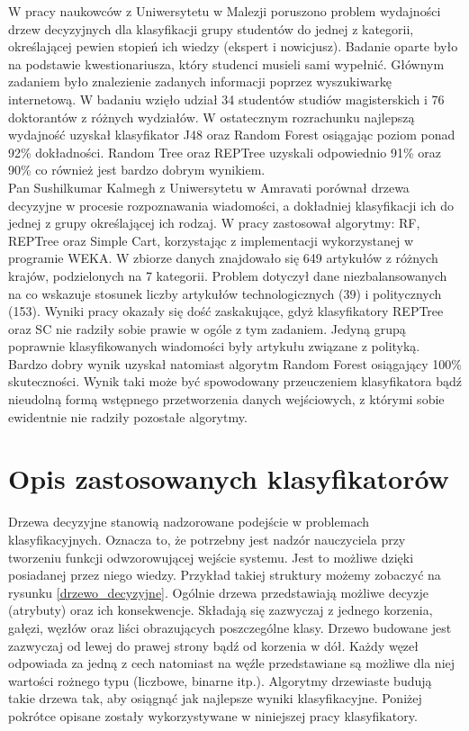 \documentclass[conference]{IEEEtran}
\begin{document}
\indent W pracy naukowców z Uniwersytetu w Malezji poruszono problem wydajności drzew decyzyjnych dla klasyfikacji grupy studentów do jednej z kategorii, określającej pewien stopień ich wiedzy (ekspert i nowicjusz). Badanie oparte było na podstawie kwestionariusza, który studenci musieli sami wypełnić. Głównym zadaniem było znalezienie zadanych informacji poprzez wyszukiwarkę internetową. W badaniu wzięło udział 34 studentów studiów magisterskich i 76 doktorantów z różnych wydziałów. W ostatecznym rozrachunku najlepszą wydajność uzyskał klasyfikator J48 oraz Random Forest osiągając poziom ponad 92\% dokładności. Random Tree oraz REPTree uzyskali odpowiednio 91\% oraz 90\% co również jest bardzo dobrym wynikiem. \cite{b3} \\
\indent Pan Sushilkumar Kalmegh z Uniwersytetu w Amravati porównał drzewa decyzyjne w procesie rozpoznawania wiadomości, a dokładniej klasyfikacji ich do jednej z grupy określającej ich rodzaj. W pracy zastosował algorytmy: RF, REPTree oraz Simple Cart, korzystając z implementacji wykorzystanej w programie WEKA. W zbiorze danych znajdowało się 	649 artykułów z różnych krajów, podzielonych na 7 kategorii. Problem dotyczył dane niezbalansowanych na co wskazuje stosunek liczby artykułów technologicznych (39) i politycznych (153). Wyniki pracy okazały się dość zaskakujące, gdyż klasyfikatory REPTree oraz SC nie radziły sobie prawie w ogóle z tym zadaniem. Jedyną grupą poprawnie klasyfikowanych wiadomości były artykułu związane z polityką. Bardzo dobry wynik uzyskał natomiast algorytm Random Forest osiągający 100\% skuteczności. Wynik taki może być spowodowany przeuczeniem klasyfikatora bądź nieudolną formą wstępnego przetworzenia danych wejściowych, z którymi sobie ewidentnie nie radziły pozostałe algorytmy.
	
 

\section{Opis zastosowanych klasyfikatorów}
Drzewa decyzyjne stanowią nadzorowane podejście w problemach klasyfikacyjnych. Oznacza to, że potrzebny jest nadzór nauczyciela przy tworzeniu funkcji odwzorowującej wejście systemu. Jest to możliwe dzięki posiadanej przez niego wiedzy.
Przykład takiej struktury możemy zobaczyć na rysunku \ref{drzewo_decyzyjne}. Ogólnie drzewa przedstawiają możliwe decyzje (atrybuty) oraz ich konsekwencje. Składają się zazwyczaj z jednego korzenia, gałęzi, węzłów oraz liści obrazujących poszczególne klasy. Drzewo budowane jest zazwyczaj od lewej do prawej strony bądź od korzenia w dół. Każdy węzeł odpowiada za jedną z cech natomiast na węźle przedstawiane są możliwe dla niej wartości rożnego typu (liczbowe, binarne itp.). Algorytmy drzewiaste budują takie drzewa tak, aby osiągnąć jak najlepsze wyniki klasyfikacyjne. Poniżej pokrótce opisane zostały wykorzystywane w niniejszej pracy klasyfikatory. 
\end{document}
